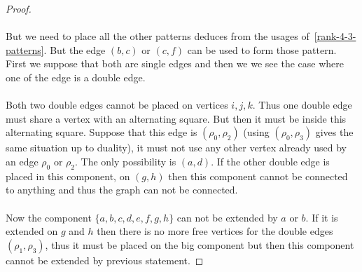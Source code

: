 \begin{proof}
\begin{figure}[H]
\begin{center}
      \caption{}
    \end{center}
  \end{figure}

  \paragraph{}
  But we need to place all the other patterns deduces from the usages of~\ref{rank-4-3-patterns}. But the edge $(b,c)$ or $(c,f)$ can be used to form those pattern. First we suppose that both are single edges and then we we see the case where one of the edge is a double edge.

  \paragraph{}
  Both two double edges cannot be placed on vertices $i,j,k$. Thus one double edge must share a vertex with an alternating square. But then it must be inside this alternating square. Suppose that this edge is $(\rho_0, \rho_2)$ (using $(\rho_0, \rho_3)$ gives the same situation up to duality), it must not use any other vertex already used by an edge $\rho_0$ or $\rho_2$. The only possibility is $(a,d)$. If the other double edge is placed in this component, on $(g,h)$ then this component cannot be connected to anything and thus the graph can not be connected.

  \paragraph{}
  Now the component $\{a,b,c,d,e,f,g,h\}$ can not be extended by $a$ or $b$. If it is extended on $g$ and $h$ then there is no more free vertices for the double edges $(\rho_1, \rho_3)$, thus it must be placed on the big component but then this component cannot be extended by previous statement.


\end{proof}
